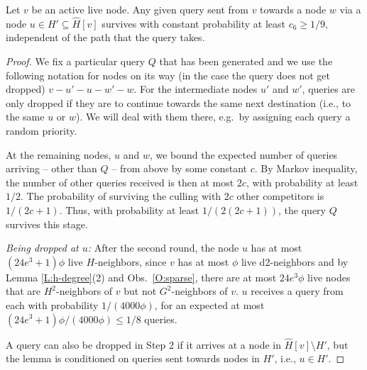 \begin{lemma} Let $v$ be an active live node. 
Any given query sent from $v$ towards a node $w$ via a node $u\in H'\subseteq \hat{H}[v]$ survives with constant probability at least $c_6 \ge 1/9$, independent of the path that the query takes.
\label{L:survival}
\end{lemma}
\begin{proof}
We fix a particular query $Q$ that has been generated and we use the following notation for nodes on its way (in the case the query does not get dropped) $v-u'-u-w'-w$.
For the intermediate nodes $u'$ and $w'$, queries are only dropped if they are to continue towards the same next destination (i.e., to the same $u$ or $w$). We will deal with them there, e.g.\ by assigning each query a random priority.

At the remaining nodes, $u$ and $w$, we bound the expected number of queries arriving -- other than $Q$ -- from above by some constant $c$. By Markov inequality, the number of other queries received is then at most $2c$, with probability at least $1/2$. The probability of surviving the culling with $2c$ other competitors is $1/(2c+1)$. 
Thus, with probability at least $1/(2(2c+1))$, the query $Q$ survives this stage.


\textit{Being dropped at $u$:} After the second round, the node $u$ has at most $(24e^3+1)\phi$ live $H$-neighbors, since $v$ has at most $\phi$ live d2-neighbors and by Lemma \ref{L:h-degree}(2) and Obs.~\ref{O:sparse}, 
there are at most $24e^3\phi$ live nodes that are $H^2$-neighbors of $v$ but not $G^2$-neighbors of $v$. $u$ receives a query from each with probability $1/(4000\phi)$, for an expected at most $(24e^3+1)\phi/(4000\phi) \le 1/8$ queries.

A query can also be dropped in Step 2 if it arrives at a node in $\hat{H}[v] \setminus H'$, but the lemma is conditioned on queries sent towards nodes in $H'$, i.e., $u\in H'$. 


\end{proof}
